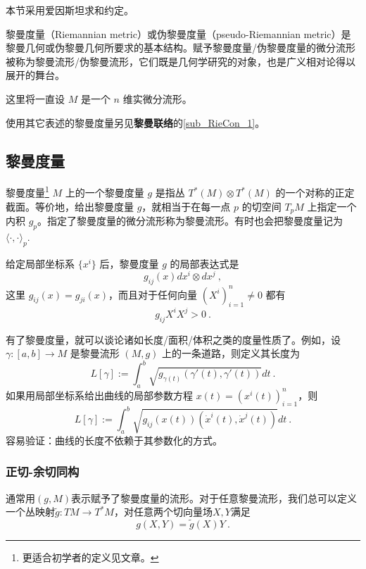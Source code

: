 
本节采用爱因斯坦求和约定。

黎曼度量（Riemannian metric）或伪黎曼度量（pseudo-Riemannian metric）是黎曼几何或伪黎曼几何所要求的基本结构。赋予黎曼度量/伪黎曼度量的微分流形被称为黎曼流形/伪黎曼流形，它们既是几何学研究的对象，也是广义相对论得以展开的舞台。

这里将一直设 $M$ 是一个 $n$ 维实微分流形。

使用其它表述的黎曼度量另见\textbf{黎曼联络}的\autoref{sub_RieCon_1}。

\subsection{黎曼度量}
\begin{definition}{黎曼度量\footnote{更适合初学者的定义见文章。}}
$M$ 上的一个黎曼度量 $g$ 是指丛 $T^*(M)\otimes T^*(M)$ 的一个对称的正定截面。等价地，给出黎曼度量 $g$，就相当于在每一点 $p$ 的切空间 $T_pM$ 上指定一个内积 $g_p$。指定了黎曼度量的微分流形称为黎曼流形。有时也会把黎曼度量记为 $\langle\cdot,\cdot\rangle_p$.
\end{definition}
给定局部坐标系 $\{x^i\}$ 后，黎曼度量 $g$ 的局部表达式是
$$
g_{ij}(x)dx^i\otimes dx^j~,
$$
这里 $g_{ij}(x)=g_{ji}(x)$，而且对于任何向量 $(X^i)_{i=1}^n\neq0$ 都有
$$
g_{ij}X^iX^j>0~.
$$

有了黎曼度量，就可以谈论诸如长度/面积/体积之类的度量性质了。例如，设 $\gamma:[a,b]\to M$ 是黎曼流形 $(M,g)$ 上的一条道路，则定义其长度为
$$
L[\gamma]:=\int_{a}^b \sqrt{g_{\gamma(t)}(\gamma'(t),\gamma'(t))}dt~.
$$
如果用局部坐标系给出曲线的局部参数方程 $x(t)=(x^i(t))_{i=1}^n$，则
$$
L[\gamma]:=\int_{a}^b \sqrt{g_{ij}(x(t))(\dot x^i(t),\dot x^j(t))}dt~.
$$
容易验证：曲线的长度不依赖于其参数化的方式。
\subsubsection{正切-余切同构}
通常用$(g,M)$表示赋予了黎曼度量的流形。对于任意黎曼流形，我们总可以定义一个丛映射$\widetilde g:TM\rightarrow T^*M$，对任意两个切向量场$X,Y$满足
\begin{equation}
g(X,Y)=\widetilde g(X)Y~.
\end{equation}

